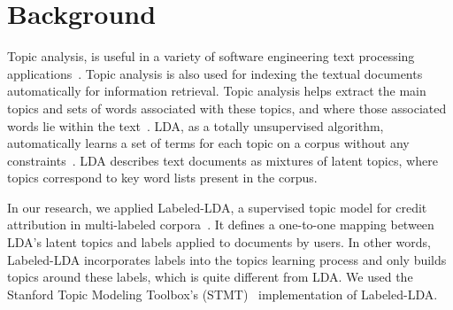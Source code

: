 \documentclass[10pt, conference, compsocconf]{IEEEtran}
\begin{document}
\section{Background}
\label{sec:background}


Topic analysis,  is useful in a variety of software engineering text
processing applications~\cite{hindle9s}. 
Topic analysis is also used for
indexing the textual documents automatically for information retrieval. %
Topic analysis helps extract the main topics and sets of 
words associated with these topics, and where those associated words lie within
the text~\cite{li2003topic}. 
LDA, as a totally unsupervised algorithm, automatically learns a set
of terms for each topic on a corpus without any constraints~\cite{blei2003}.
LDA describes text documents as
mixtures of latent topics, where topics correspond to key word lists
present in the corpus.

In our research, we applied Labeled-LDA, 
a supervised topic model for credit
attribution in multi-labeled corpora~\cite{labeledlda}. It defines a
one-to-one mapping between LDA's latent topics and labels applied to
documents by 
users. In other words, Labeled-LDA incorporates labels into
the topics learning process and only builds topics around these labels,
which is quite different from LDA. 
We used the Stanford Topic Modeling Toolbox's
(STMT)~\cite{stmt} implementation of Labeled-LDA. 

\end{document}

